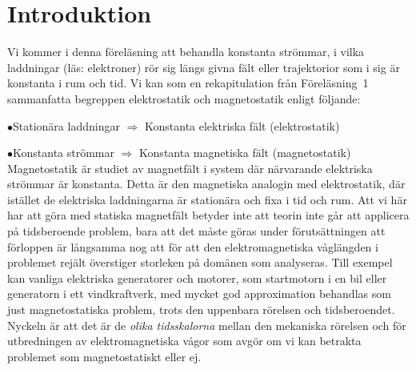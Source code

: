 {{\section{Introduktion}
Vi kommer i denna f{\"o}rel{\"a}sning att behandla konstanta str{\"o}mmar, i
vilka laddningar (l{\"a}s: elektroner) r{\"o}r sig l{\"a}ngs givna f{\"a}lt
eller trajektorior som i sig {\"a}r konstanta i rum och tid.
Vi kan som en rekapitulation fr{\aa}n F{\"o}rel{\"a}sning~1 sammanfatta
begreppen elektrostatik och magnetostatik enligt f{\"o}ljande:
\medskip
\item{$\bullet$}{Station{\"a}ra laddningar $\Rightarrow$
  Konstanta elektriska f{\"a}lt (elektrostatik)}
\item{$\bullet$}{Konstanta str{\"o}mmar $\Rightarrow$
  Konstanta magnetiska f{\"a}lt (magnetostatik)}
\medskip
\noindent
Magnetostatik {\"a}r studiet av magnetf{\"a}lt i system d{\"a}r n{\"a}rvarande
elektriska str{\"o}mmar {\"a}r konstanta. Detta {\"a}r den magnetiska analogin
med elektrostatik, d{\"a}r ist{\"a}llet de elektriska laddningarna {\"a}r
station{\"a}ra och fixa i tid och rum.
Att vi h{\"a}r har att g{\"o}ra med statiska magnetf{\"a}lt betyder inte att
teorin inte g{\aa}r att applicera p{\aa} tidsberoende problem, bara att det
m{\aa}ste g{\"o}ras under f{\"o}ruts{\"a}ttningen att f{\"o}rloppen {\"a}r
l{\aa}ngsamma nog att f{\"o}r att den elektromagnetiska v{\aa}gl{\"a}ngden
 i problemet rej{\"a}lt {\"o}verstiger
storleken p{\aa} dom{\"a}nen som analyseras.
Till exempel kan vanliga elektriska generatorer och motorer, som startmotorn
i en bil eller generatorn i ett vindkraftverk, med mycket god approximation
behandlas som just magnetostatiska problem, trots den uppenbara r{\"o}relsen
och tidsberoendet. Nyckeln {\"a}r att det {\"a}r de {\it olika tidsskalorna}
mellan den mekaniska r{\"o}relsen och f{\"o}r utbredningen av elektromagnetiska
v{\aa}gor som avg{\"o}r om vi kan betrakta problemet som magnetostatiskt eller
ej.

}}
